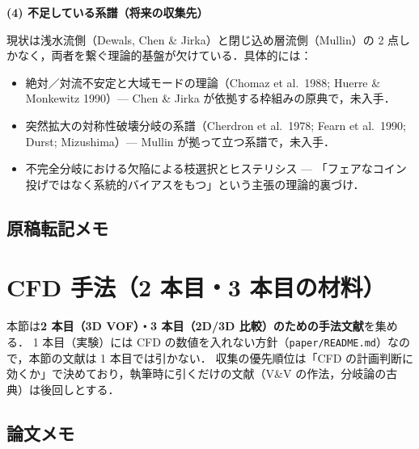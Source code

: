 \documentclass[11pt]{jsarticle}
\let\litsectionorig\section
\renewcommand{\section}{\clearpage\litsectionorig}
\begin{document}
\medskip
\noindent\textbf{(4) 不足している系譜（将来の収集先）}

現状は浅水流側（Dewals, Chen \& Jirka）と閉じ込め層流側（Mullin）の 2 点しかなく，両者を繋ぐ理論的基盤が欠けている．具体的には：

\begin{itemize}
  \item 絶対／対流不安定と大域モードの理論（Chomaz et al.\ 1988; Huerre \& Monkewitz 1990）— Chen \& Jirka が依拠する枠組みの原典で，未入手．
  \item 突然拡大の対称性破壊分岐の系譜（Cherdron et al.\ 1978; Fearn et al.\ 1990; Durst; Mizushima）— Mullin が拠って立つ系譜で，未入手．
  \item 不完全分岐における欠陥による枝選択とヒステリシス — 「フェアなコイン投げではなく系統的バイアスをもつ」という主張の理論的裏づけ．
\end{itemize}

\subsection*{原稿転記メモ}

\section{CFD 手法（2 本目・3 本目の材料）}

\noindent 本節は\textbf{2 本目（3D VOF）・3 本目（2D/3D 比較）のための手法文献}を集める．
1 本目（実験）には CFD の数値を入れない方針（\texttt{paper/README.md}）なので，本節の文献は 1 本目では引かない．
収集の優先順位は「CFD の計画判断に効くか」で決めており，執筆時に引くだけの文献（V\&V の作法，分岐論の古典）は後回しとする．

\subsection*{論文メモ}
\end{document}
